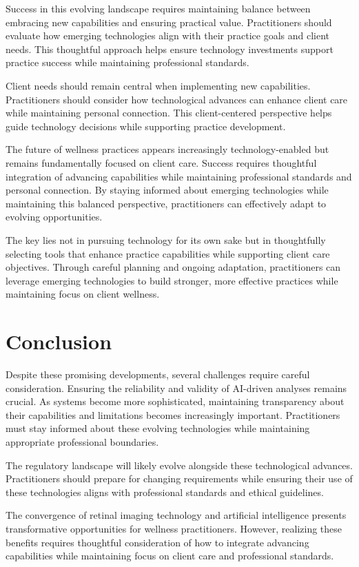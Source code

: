 \documentclass[
  Letterpaper,
]{scrbook}
\begin{document}
Success in this evolving landscape requires maintaining balance between
embracing new capabilities and ensuring practical value. Practitioners
should evaluate how emerging technologies align with their practice
goals and client needs. This thoughtful approach helps ensure technology
investments support practice success while maintaining professional
standards.

Client needs should remain central when implementing new capabilities.
Practitioners should consider how technological advances can enhance
client care while maintaining personal connection. This client-centered
perspective helps guide technology decisions while supporting practice
development.

The future of wellness practices appears increasingly technology-enabled
but remains fundamentally focused on client care. Success requires
thoughtful integration of advancing capabilities while maintaining
professional standards and personal connection. By staying informed
about emerging technologies while maintaining this balanced perspective,
practitioners can effectively adapt to evolving opportunities.

The key lies not in pursuing technology for its own sake but in
thoughtfully selecting tools that enhance practice capabilities while
supporting client care objectives. Through careful planning and ongoing
adaptation, practitioners can leverage emerging technologies to build
stronger, more effective practices while maintaining focus on client
wellness.

\section{Conclusion}\label{conclusion-3}

Despite these promising developments, several challenges require careful
consideration. Ensuring the reliability and validity of AI-driven
analyses remains crucial. As systems become more sophisticated,
maintaining transparency about their capabilities and limitations
becomes increasingly important. Practitioners must stay informed about
these evolving technologies while maintaining appropriate professional
boundaries.

The regulatory landscape will likely evolve alongside these
technological advances. Practitioners should prepare for changing
requirements while ensuring their use of these technologies aligns with
professional standards and ethical guidelines.

The convergence of retinal imaging technology and artificial
intelligence presents transformative opportunities for wellness
practitioners. However, realizing these benefits requires thoughtful
consideration of how to integrate advancing capabilities while
maintaining focus on client care and professional standards.
\end{document}
